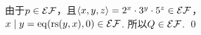\begin{pf} \rm 

由于$p\in\mathcal{EF}$，且$\langle x,y,z\rangle = 2^x \cdot 3^y \cdot 5^z\in\mathcal{EF}$，\\$x\;|\;y=\mathrm{eq}(\mathrm{rs}(y, x), 0)\in\mathcal{EF}$.
所以$Q\in\mathcal{EF}$.
    \qed
\end{pf}
